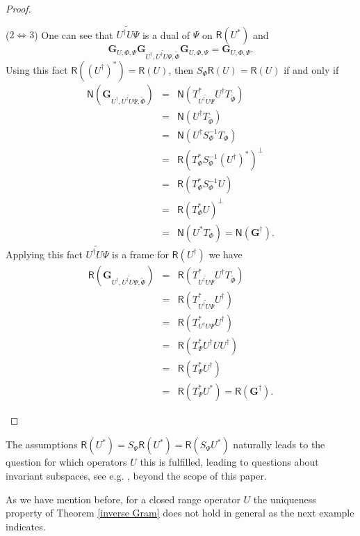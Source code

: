 \documentclass{birkjour}
\theoremstyle{definition}
\theoremstyle{remark}
\numberwithin{equation}{section}
\newcommand{\range}[1]{\mathsf{R}\left( #1 \right)}
\newcommand{\kernel}[1]{\mathsf{N}\left( #1 \right)}
\begin{document}
\begin{proof}
\begin{enumerate}
($2\Leftrightarrow 3$) One can see that $\widetilde{U^{\dagger}U\Psi}$ is a dual of $\Psi$ on $\range{U^{*}}$ and
 $$\mathbf{G}_{U,\Phi,\Psi}\mathbf{G}_{U^{\dagger},\widetilde{U^{\dagger}U\Psi},\widetilde{\Phi}}\mathbf{G}_{U,\Phi,\Psi}=\mathbf{G}_{U,\Phi,\Psi}.$$
Using this fact $\range{(U^{\dagger})^*}=\range{U}$, then $S_{\Phi}\range{U}=\range{U}$ if and only if
 \begin{eqnarray*}
 \kernel{\mathbf{G}_{U^{\dagger},\widetilde{U^{\dagger}U\Psi},\widetilde{\Phi}}}&=&
 \kernel{T_{\widetilde{U^{\dagger}U\Psi}}^*
U^{\dagger}T_{\widetilde{\Phi}}}\\
&=&\kernel{
U^{\dagger}T_{\widetilde{\Phi}}}\\
&=&\kernel{
U^{\dagger}S_{\Phi}^{-1}T_{\Phi}}\\
&=&\range{T_{\Phi}^*S_{\Phi}^{-1}(U^{\dagger})^*}^{\perp}\\
&=&\range{T_{\Phi}^*S_{\Phi}^{-1}U}\\
&=&\range{T_{\Phi}^*U}^{\perp}\\
&=&\kernel{U^*T_{\Phi}}=\kernel{\mathbf{G}^{\dagger}}.
 \end{eqnarray*}
Applying this fact $\widetilde{U^{\dagger}U\Psi}$ is a frame for   $\range{U^{\dagger}}$ we have
 \begin{eqnarray*}
 \range{\mathbf{G}_{U^{\dagger},\widetilde{U^{\dagger}U\Psi},\widetilde{\Phi}}}&=&
 \range{T_{\widetilde{U^{\dagger}U\Psi}}^*
U^{\dagger}T_{\widetilde{\Phi}}}\\
&=&
 \range{T_{\widetilde{U^{\dagger}U\Psi}}^*
U^{\dagger}}\\
&=&
 \range{T_{U^{\dagger}U\Psi}^*
U^{\dagger}}\\
&=&\range{T_{\Psi}^*U^{\dagger}UU^{\dagger}}\\
&=&\range{T_{\Psi}^*U^{\dagger}}\\
&=&\range{T_{\Psi}^*U^{*}}=\range{\mathbf{G}^{\dagger}}.
 \end{eqnarray*}
\end{enumerate}
\end{proof}

The assumptions $\range{U^*}=S_{\Psi}\range{U^*} = \range{S_{\Psi} U^*} $ naturally leads to the question for which operators $U$ this is fulfilled, leading to questions about invariant subspaces, see e.g. \cite{enflom01}, beyond the scope of this paper.


As we have mention before, for a closed range operator  $U$
the uniqueness property of Theorem \ref{inverse Gram} does not hold in general
as the next example indicates.
\end{document}
